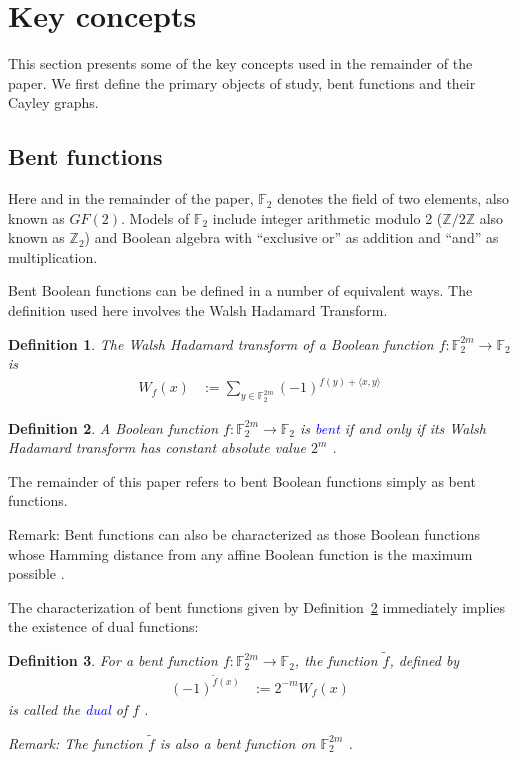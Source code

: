 \documentclass[12pt,a4paper]{article}
\newcommand{\mb}[1]{\mathbb{#1}}
\newcommand{\F}{\mb{F}}
\newcommand{\Z}{\mb{Z}}
\newcommand{\To}{\rightarrow}
\newcommand{\Emph}[1]{\emph{\textcolor{blue}{#1}}}
\newcommand{\dual}[1]{\widetilde{#1}}
\newtheorem{Definition}{Definition}
\begin{document}
\section{Key concepts}
\label{sec-Preliminaries}

This section presents some of the key concepts used in the remainder of the paper.
We first define the primary objects of study, bent functions and their Cayley graphs.

\subsection{Bent functions}

Here and in the remainder of the paper, $\F_2$ denotes the field of two elements,
also known as $GF(2)$. Models of $\F_2$ include integer arithmetic modulo 2
($\Z/2\Z$ also known as $\Z_2$) and Boolean algebra with ``exclusive or'' as addition and ``and''
as multiplication.

Bent Boolean functions can be defined in a number of equivalent ways.
The definition used here involves the Walsh Hadamard Transform.
\begin{Definition}
\label{def-Walsh-Hadamard-transform}
The Walsh Hadamard transform of
a Boolean function $f : \F_2^{2m} \To \F_2$ is
\begin{align*}
W_f(x)
&:=
\sum_{y \in \F_2^{2m}} (-1)^{f(y) + \langle x, y \rangle}
\end{align*}
\end{Definition}

\begin{Definition}
\label{def-Bent-function}
A Boolean function $f : \F_2^{2m} \To \F_2$ is \Emph{bent}
if and only if its Walsh Hada\-mard transform has constant absolute value $2^{m}$ \cite[p. 74]{Dil74}
\cite[p. 300]{Rot76}.
\end{Definition}

The remainder of this paper refers to bent Boolean functions simply as bent functions.

Remark: Bent functions can also be characterized as those Boolean functions whose Hamming distance
from any affine Boolean function is the maximum possible \cite[Theorem 3.3]{MeiS90}.

The characterization of bent functions given by Definition~\ref{def-Bent-function} immediately
implies the existence of dual functions:
\begin{Definition}
\label{def-dual-Bent-function}
For a bent function $f : \F_2^{2m} \To \F_2$, the function $\dual{f}$, defined by
\begin{align*}
(-1)^{\dual{f}(x)} &:= 2^{-m} W_f(x)
\end{align*}
is called the \Emph{dual} of $f$ \cite{CarDPS10self}.

Remark: The function $\dual{f}$ is also a bent function on $\F_2^{2m}$ \cite[p. 301]{Rot76}.
\end{Definition}
\end{document}
